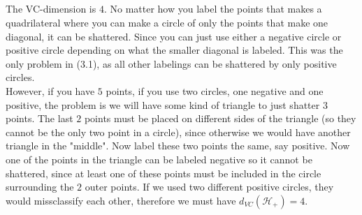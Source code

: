 \documentclass[a4paper]{article}
\begin{document}
\subsection{}
The VC-dimension is $4$. No matter how you label the points that makes a quadrilateral where you can make a circle of only the points that make one diagonal, it can be shattered. Since you can just use either a negative circle or positive circle depending on what the smaller diagonal is labeled. This was the only problem in (3.1), as all other labelings can be shattered by only positive circles. \\
However, if you have $5$ points, if you use two circles, one negative and one positive, the problem is we will have some kind of triangle to just shatter $3$ points. The last $2$ points must be placed on different sides of the triangle (so they cannot be the only two point in a circle), since otherwise we would have another triangle in the "middle". Now label these two points the same, say positive. Now one of the points in the triangle can be labeled negative so it cannot be shattered, since at least one of these points must be included in the circle surrounding the $2$ outer points. If we used two different positive circles, they would missclassify each other, therefore we must have $d_{VC}(\mathcal{H}_+)=4$.
\end{document}
